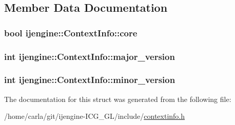 \subsection{Member Data Documentation}
\hypertarget{structijengine_1_1ContextInfo_ae94af83cb75cdf9565ad810819d25351}{
\subsubsection[{core}]{\setlength{\rightskip}{0pt plus 5cm}bool ijengine\-::\-Context\-Info\-::core}}\label{structijengine_1_1ContextInfo_ae94af83cb75cdf9565ad810819d25351}
\hypertarget{structijengine_1_1ContextInfo_a44c279f6a92cc71d0646efc13f20b925}{
\subsubsection[{major\-\_\-version}]{\setlength{\rightskip}{0pt plus 5cm}int ijengine\-::\-Context\-Info\-::major\-\_\-version}}\label{structijengine_1_1ContextInfo_a44c279f6a92cc71d0646efc13f20b925}
\hypertarget{structijengine_1_1ContextInfo_a9027633774ff617b758c3be0ad456933}{
\subsubsection[{minor\-\_\-version}]{\setlength{\rightskip}{0pt plus 5cm}int ijengine\-::\-Context\-Info\-::minor\-\_\-version}}\label{structijengine_1_1ContextInfo_a9027633774ff617b758c3be0ad456933}


The documentation for this struct was generated from the following file\-:\begin{DoxyCompactItemize}
\item 
/home/carla/git/ijengine-\/\-I\-C\-G\-\_\-\-G\-L/include/\hyperlink{contextinfo_8h}{contextinfo.\-h}\end{DoxyCompactItemize}
